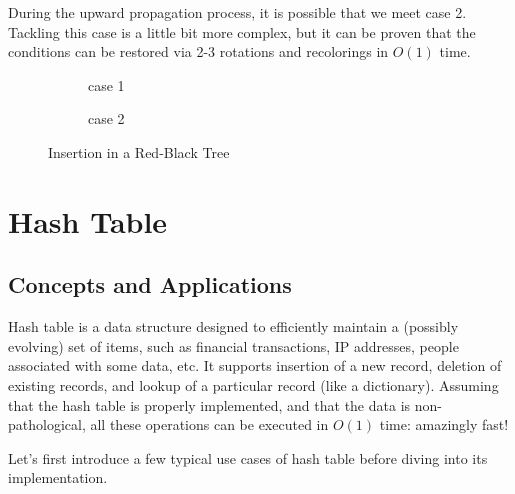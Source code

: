 During the upward propagation process, it is possible that we meet case 2. Tackling this case is a little bit more complex, but it can be proven that the conditions can be restored via 2-3 rotations and recolorings in $O(1)$ time.

\begin{figure}[H]
\begin{subfigure}{.6\textwidth}
\centering
{}
\caption{case 1}
\end{subfigure}
\begin{subfigure}{.3\textwidth}
\centering
{}
\caption{case 2}
\end{subfigure}
\caption{Insertion in a Red-Black Tree}\label{redblackinsertion}
\end{figure}
\section{Hash Table}
\subsection{Concepts and Applications}
Hash table is a data structure designed to efficiently maintain a (possibly evolving) set of items, such as financial transactions, IP addresses, people associated with some data, etc. It supports insertion of a new record, deletion of existing records, and lookup of a particular record (like a dictionary). Assuming that the hash table is properly implemented, and that the data is non-pathological, all these operations can be executed in $O(1)$ time: amazingly fast!

Let's first introduce a few typical use cases of hash table before diving into its implementation. 

